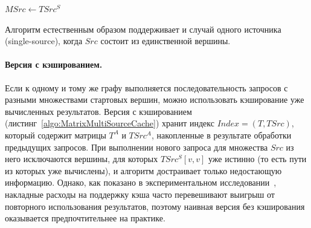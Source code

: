 \begin{algorithm}
    $MSrc \gets TSrc^S$\;
    \;
    \caption{Матричный алгоритм КС-достижимости для нескольких источников}
    \label{algo:MatrixMultiSource}
\end{algorithm}

Алгоритм естественным образом поддерживает и случай одного источника (single-source), когда $\mathit{Src}$ состоит из единственной вершины.

\paragraph{Версия с кэшированием.}
Если к одному и тому же графу выполняется последовательность запросов с разными множествами стартовых вершин, можно использовать кэширование уже вычисленных результатов.
Версия с кэшированием (листинг~\ref{algo:MatrixMultiSourceCache}) хранит индекс $\mathit{Index} = (T, TSrc)$, который содержит матрицы $T^A$ и $TSrc^A$, накопленные в результате обработки предыдущих запросов.
При выполнении нового запроса для множества $\mathit{Src}$ из него исключаются вершины, для которых $TSrc^S[v,v]$ уже истинно (то есть пути из которых уже вычислены), и алгоритм достраивает только недостающую информацию.
Однако, как показано в экспериментальном исследовании~, накладные расходы на поддержку кэша часто перевешивают выигрыш от повторного использования результатов, поэтому наивная версия без кэширования оказывается предпочтительнее на практике.

